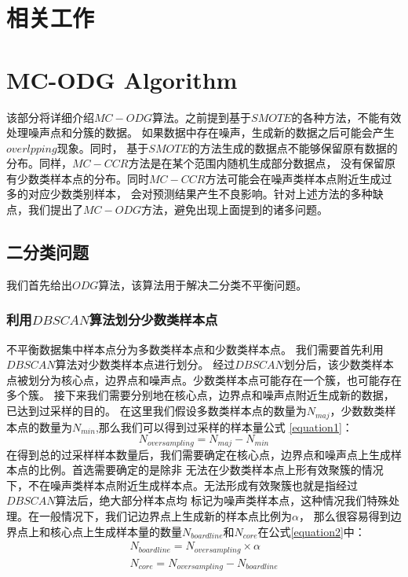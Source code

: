\documentclass{article}
\begin{document}
\section{相关工作}


\section{MC-ODG Algorithm}
该部分将详细介绍$MC-ODG$算法。之前提到基于$SMOTE$的各种方法，不能有效处理噪声点和分簇的数据。
如果数据中存在噪声，生成新的数据之后可能会产生$overlpping$现象。同时，
基于$SMOTE$的方法生成的数据点不能够保留原有数据的分布。同样，$MC-CCR$方法是在某个范围内随机生成部分数据点，
没有保留原有少数类样本点的分布。同时$MC-CCR$方法可能会在噪声类样本点附近生成过多的对应少数类别样本，
会对预测结果产生不良影响。针对上述方法的多种缺点，我们提出了$MC-ODG$方法，避免出现上面提到的诸多问题。
\subsection{二分类问题}
我们首先给出$ODG$算法，该算法用于解决二分类不平衡问题。
\subsubsection{利用$DBSCAN$算法划分少数类样本点}
不平衡数据集中样本点分为多数类样本点和少数类样本点。
我们需要首先利用$DBSCAN$算法对少数类样本点进行划分。
经过$DBSCAN$划分后，该少数类样本点被划分为核心点，边界点和噪声点。少数类样本点可能存在一个簇，也可能存在多个簇。
接下来我们需要分别地在核心点，边界点和噪声点附近生成新的数据，已达到过采样的目的。
在这里我们假设多数类样本点的数量为$N_{maj}$，少数数类样本点的数量为$N_{min}$,那么我们可以得到过采样的样本量公式 \ref{equation1}：
\begin{equation}\label{equation1}
  N_{oversampling}=N_{maj}-N_{min}
\end{equation}
在得到总的过采样样本数量后，我们需要确定在核心点，边界点和噪声点上生成样本点的比例。首选需要确定的是除非
无法在少数类样本点上形有效聚簇的情况下，不在噪声类样本点附近生成样本点。无法形成有效聚簇也就是指经过$DBSCAN$算法后，绝大部分样本点均
标记为噪声类样本点，这种情况我们特殊处理。在一般情况下，我们记边界点上生成新的样本点比例为$\alpha$，
那么很容易得到边界点上和核心点上生成样本量的数量$N_{boardline}$和$N_{core}$在公式\ref{equation2}中：
\begin{equation}
  \label{equation2}
\begin{aligned}
  N_{boardline}=N_{oversampling}\times \alpha \\
  N_{core}=N_{oversampling}-N_{boardline}
\end{aligned}
\end{equation}
\end{document}
